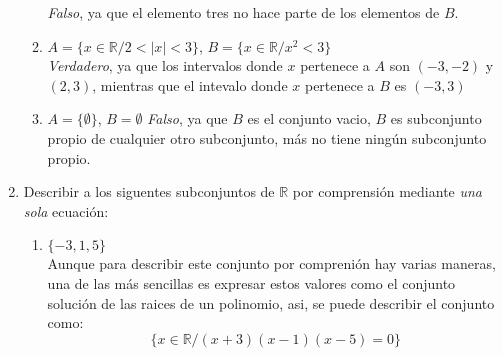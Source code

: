\documentclass[a4paper,11pt]{article}
\newcommand{\real}{\mathbb{R}}
\begin{document}
\begin{enumerate}
\begin{enumerate}[label = \roman*)]
                    \textit{Falso}, ya que el elemento tres no hace parte de los elementos de $B$.
                \item $A=\{x\in \mathbb{R}/2<|x|<3\}$, $B=\{x\in \mathbb{R}/x^{2}<3\}$\\
                    \textit{Verdadero}, ya que los intervalos donde $x$ pertenece a $A$ son $(-3,-2)$ y $(2,3)$, mientras que el intevalo donde $x$ pertenece a $B$ es $(-3,3)$
                \item $A=\{\emptyset\}$, $B=\emptyset$
                    \textit{Falso}, ya que $B$ es el conjunto vacio, $B$ es subconjunto propio de cualquier otro subconjunto, m\'as no tiene ning\'un subconjunto propio.
            \end{enumerate}
        \item Describir a los siguentes subconjuntos de $\real$ por comprensi\'on mediante \textit{una sola} ecuaci\'on:
        \begin{enumerate}
            \item $\{-3,1,5\}$\\
            Aunque para describir este conjunto por compreni\'on hay varias maneras, una de las m\'as sencillas es expresar estos valores como el conjunto soluci\'on de las raices de un polinomio, asi, se puede describir el conjunto como:
            \begin{equation}
                \{x\in \mathbb{R}/(x+3)(x-1)(x-5)=0\}
            \end{equation}

            
            
        \end{enumerate}



    \end{enumerate}
\end{document}
